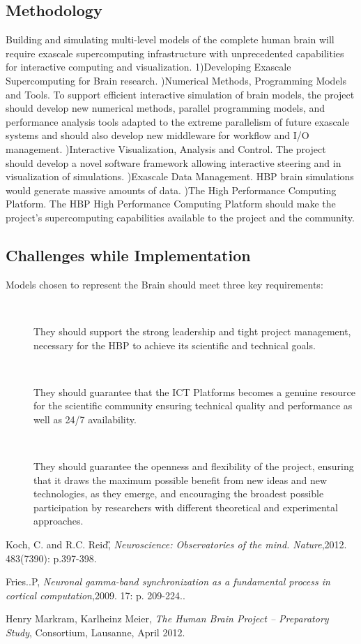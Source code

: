 \documentclass{article}
\let\Item\item
\newcommand\SpecialItem{\renewcommand\item[1][]{\Item[\textbullet~\bfseries##1]}}
\begin{document}
\subsection*{Methodology}
Building and simulating multi-level models of the complete human brain will require exascale supercomputing infrastructure with unprecedented capabilities for interactive computing and visualization.
1)Developing Exascale Supercomputing for Brain research.
)Numerical Methods, Programming Models and Tools. To support efficient interactive simulation of brain models, the project should develop new numerical methods, parallel programming models, and performance analysis tools adapted to the extreme parallelism of future exascale systems and should also develop new middleware for workflow and I/O management.
)Interactive Visualization, Analysis and Control. The project should develop a novel software framework allowing interactive steering and in visualization of simulations.
)Exascale Data Management. HBP brain simulations would generate massive amounts of data. 
)The High Performance Computing Platform. The HBP High Performance Computing Platform should make the project’s supercomputing capabilities available to the project and the community.\cite{Markram}
\subsection*{Challenges while Implementation}
Models chosen to represent the Brain should meet three key requirements:
\SpecialItem
\begin{description}
\item They should support the strong leadership and tight project management, necessary for the HBP to achieve its scientific and technical goals.
\item They should guarantee that the ICT Platforms becomes a genuine resource for the scientific community ensuring technical quality and performance as well as 24/7 availability.
\item They should guarantee the openness and flexibility of the project, ensuring that it draws the maximum possible benefit from new ideas and new technologies, as they emerge, and encouraging the broadest possible participation by researchers with different theoretical and experimental approaches.
\cite{Markram}
\end{description}
	 

\begin{thebibliography}{9}

 Koch, C. and R.C. Reid\H , \emph{Neuroscience: Observatories of the mind. Nature},2012. 483(7390): p.397-398.

 Fries..P,  \emph{Neuronal gamma-band synchronization as a fundamental process in cortical computation},2009. 17: p. 209-224..

Henry Markram, Karlheinz Meier, \emph{The Human Brain Project – Preparatory Study}, Consortium, Lausanne, April 2012.

\end{thebibliography}
\end{document}
